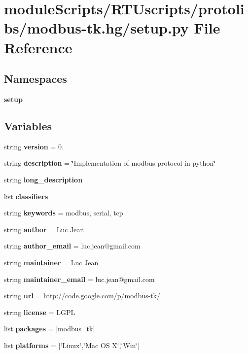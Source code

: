 \section{module\+Scripts/\+R\+T\+Uscripts/protolibs/modbus-\/tk.hg/setup.py File Reference}
\label{setup_8py}
\subsection*{Namespaces}
\begin{DoxyCompactItemize}
\item 
 {\bf setup}
\end{DoxyCompactItemize}
\subsection*{Variables}
\begin{DoxyCompactItemize}
\item 
string {\bf version} = \textquotesingle{}0.\textquotesingle{}
\item 
string {\bf description} = \char`\"{}Implementation of modbus protocol in python\char`\"{}
\item 
string {\bf long\+\_\+description}
\item 
list {\bf classifiers}
\item 
string {\bf keywords} = \textquotesingle{}modbus, serial, tcp\textquotesingle{}
\item 
string {\bf author} = \textquotesingle{}Luc Jean\textquotesingle{}
\item 
string {\bf author\+\_\+email} = \textquotesingle{}luc.\+jean@gmail.\+com\textquotesingle{}
\item 
string {\bf maintainer} = \textquotesingle{}Luc Jean\textquotesingle{}
\item 
string {\bf maintainer\+\_\+email} = \textquotesingle{}luc.\+jean@gmail.\+com\textquotesingle{}
\item 
string {\bf url} = \textquotesingle{}http\+://code.\+google.\+com/p/modbus-\/tk/\textquotesingle{}
\item 
string {\bf license} = \textquotesingle{}L\+G\+P\+L\textquotesingle{}
\item 
list {\bf packages} = [\textquotesingle{}modbus\+\_\+tk\textquotesingle{}]
\item 
list {\bf platforms} = [\char`\"{}Linux\char`\"{},\char`\"{}Mac O\+S X\char`\"{},\char`\"{}Win\char`\"{}]
\end{DoxyCompactItemize}
